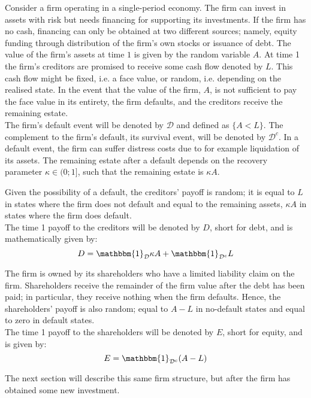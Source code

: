 \documentclass[main.tex]{subfiles}
\begin{document}
        Consider a firm operating in a single-period economy.
        The firm can invest in assets with risk but needs financing for supporting its investments.
        If the firm has no cash, financing can only be obtained at two different sources;
        namely, equity funding through distribution of the firm's own stocks or issuance of debt.
        The value of the firm's assets at time $1$ is given by the random variable $A$.
        At time 1 the firm's creditors are promised to receive some cash flow denoted by $L$.
        This cash flow might be fixed, i.e. a face value, 
        or random, i.e. depending on the realised state.
        In the event that the value of the firm, $A$, is not sufficient to pay the face value in its entirety, 
        the firm defaults, and the creditors receive the remaining estate.
        \\
        The firm's default event will be denoted by $\mathcal{D}$ and defined as $\{A < L\}$.
        The complement to the firm's default, its survival event, 
        will be denoted by $\mathcal{D}^{c}$.
        In a default event, the firm can suffer distress costs due to for example liquidation of its assets.
        The remaining estate after a default depends on the recovery parameter $\kappa \in (0;1]$, 
        such that the remaining estate is $\kappa A$.
        
        Given the possibility of a default, the creditors' payoff is random; 
        it is equal to $L$ in states where the firm does not default
        and equal to the remaining assets, $\kappa A$ in states where the firm does default.
        \\
        The time 1 payoff to the creditors will be denoted by $D$, short for debt,
        and is mathematically given by:
            \begin{equation*}
                D
                =
                \mathbbm{1}_{\mathcal{D}} \kappa A
                +
                \mathbbm{1}_{\mathcal{D}^{c}} L
            \end{equation*}
        
        The firm is owned by its shareholders who have a limited liability claim on the firm.
        Shareholders receive the remainder of the firm value after the debt has been paid;
        in particular, they receive nothing when the firm defaults.
        Hence, the shareholders' payoff is also random;
        equal to $A - L$ in no-default states and equal to zero in default states.
        \\
        The time 1 payoff to the shareholders will be denoted by $E$, short for equity,
        and is given by:
            \begin{equation*}
                E
                =
                \mathbbm{1}_{\mathcal{D}^{c}} 
                (A - L)
            \end{equation*}
        
        The next section will describe this same firm structure,
        but after the firm has obtained some new investment. 
\end{document}
